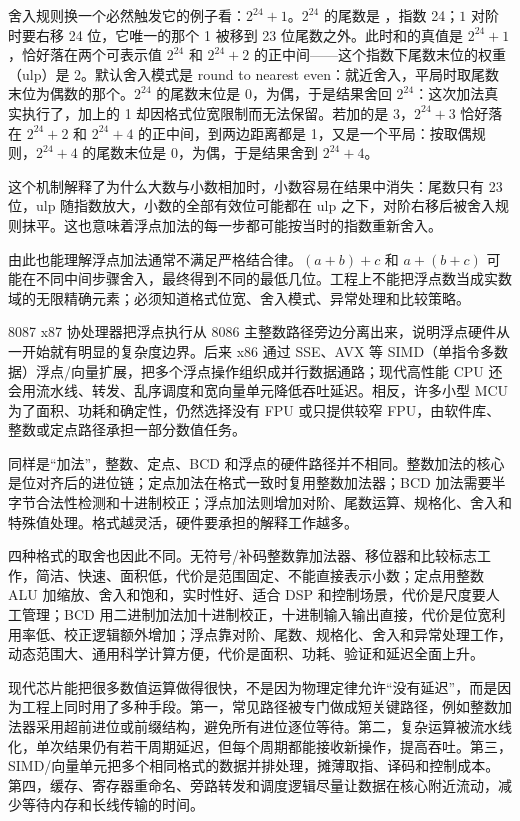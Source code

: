 舍入规则换一个必然触发它的例子看：$2^{24} + 1$。$2^{24}$ 的尾数是 ，指数 24；$1$ 对阶时要右移 24 位，它唯一的那个 1 被移到 23 位尾数之外。此时和的真值是 $2^{24} + 1$，恰好落在两个可表示值 $2^{24}$ 和 $2^{24} + 2$ 的正中间——这个指数下尾数末位的权重（ulp）是 2。默认舍入模式是 round to nearest even：就近舍入，平局时取尾数末位为偶数的那个。$2^{24}$ 的尾数末位是 0，为偶，于是结果舍回 $2^{24}$：这次加法真实执行了，加上的 1 却因格式位宽限制而无法保留。若加的是 3，$2^{24} + 3$ 恰好落在 $2^{24} + 2$ 和 $2^{24} + 4$ 的正中间，到两边距离都是 1，又是一个平局：按取偶规则，$2^{24} + 4$ 的尾数末位是 0，为偶，于是结果舍到 $2^{24} + 4$。

这个机制解释了为什么大数与小数相加时，小数容易在结果中消失：尾数只有 23 位，ulp 随指数放大，小数的全部有效位可能都在 ulp 之下，对阶右移后被舍入规则抹平。这也意味着浮点加法的每一步都可能按当时的指数重新舍入。

由此也能理解浮点加法通常不满足严格结合律。$(a+b)+c$ 和 $a+(b+c)$ 可能在不同中间步骤舍入，最终得到不同的最低几位。工程上不能把浮点数当成实数域的无限精确元素；必须知道格式位宽、舍入模式、异常处理和比较策略。

\begin{chipcase}
8087 x87 协处理器把浮点执行从 8086 主整数路径旁边分离出来，说明浮点硬件从一开始就有明显的复杂度边界。后来 x86 通过 SSE、AVX 等 SIMD（单指令多数据）浮点/向量扩展，把多个浮点操作组织成并行数据通路；现代高性能 CPU 还会用流水线、转发、乱序调度和宽向量单元降低吞吐延迟。相反，许多小型 MCU 为了面积、功耗和确定性，仍然选择没有 FPU 或只提供较窄 FPU，由软件库、整数或定点路径承担一部分数值任务。
\end{chipcase}

同样是“加法”，整数、定点、BCD 和浮点的硬件路径并不相同。整数加法的核心是位对齐后的进位链；定点加法在格式一致时复用整数加法器；BCD 加法需要半字节合法性检测和十进制校正；浮点加法则增加对阶、尾数运算、规格化、舍入和特殊值处理。格式越灵活，硬件要承担的解释工作越多。

四种格式的取舍也因此不同。无符号/补码整数靠加法器、移位器和比较标志工作，简洁、快速、面积低，代价是范围固定、不能直接表示小数；定点用整数 ALU 加缩放、舍入和饱和，实时性好、适合 DSP 和控制场景，代价是尺度要人工管理；BCD 用二进制加法加十进制校正，十进制输入输出直接，代价是位宽利用率低、校正逻辑额外增加；浮点靠对阶、尾数、规格化、舍入和异常处理工作，动态范围大、通用科学计算方便，代价是面积、功耗、验证和延迟全面上升。

现代芯片能把很多数值运算做得很快，不是因为物理定律允许“没有延迟”，而是因为工程上同时用了多种手段。第一，常见路径被专门做成短关键路径，例如整数加法器采用超前进位或前缀结构，避免所有进位逐位等待。第二，复杂运算被流水线化，单次结果仍有若干周期延迟，但每个周期都能接收新操作，提高吞吐。第三，SIMD/向量单元把多个相同格式的数据并排处理，摊薄取指、译码和控制成本。第四，缓存、寄存器重命名、旁路转发和调度逻辑尽量让数据在核心附近流动，减少等待内存和长线传输的时间。

